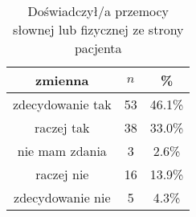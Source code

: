\begin{table}[H]
\caption{Doświadczył/a przemocy słownej lub fizycznej ze strony pacjenta}
\centering
\begin{tabular}{ | c | c | c |}
\hline
zmienna & $n$ & \% \\
\hline
zdecydowanie tak  &  53  & 46.1\% \\
\hline
raczej tak  &  38  & 33.0\% \\
\hline
nie mam zdania  &  3  & 2.6\% \\
\hline
raczej nie  &  16  & 13.9\% \\
\hline
zdecydowanie nie  &  5  & 4.3\% \\
\hline
\end{tabular}
\label{tab:Q16}
\end{table}
